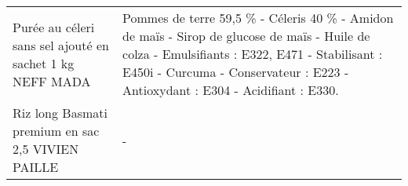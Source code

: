 \begin{longtable}{p{5cm}p{10cm}}
                                                 Purée au céleri sans sel ajouté en sachet 1 kg NEFF MADA &                                                                                                                                                                                                                                                                                                                                                                                                                                                                                                                                                                                                                                                                                                                                                                                                           Pommes de terre 59,5 \% - Céleris 40 \% - Amidon de maïs - Sirop de glucose de maïs - Huile de colza - Emulsifiants : E322, E471 - Stabilisant : E450i - Curcuma - Conservateur : E223 - Antioxydant : E304 - Acidifiant : E330. \\
                                                        Riz long Basmati premium en sac 2,5 VIVIEN PAILLE &                                                                                                                                                                                                                                                                                                                                                                                                                                                                                                                                                                                                                                                                                                                                                                                                                                                                                                                                                                                                                                        - \\

\end{longtable}
